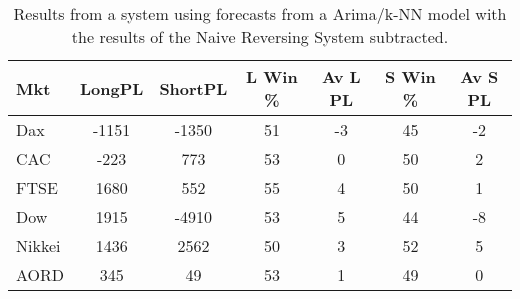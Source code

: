 \begin{table}[ht]
\centering
\caption[Mean PL from hybrid ARIMA/k-NN models minus mean PL from Naive Reverse system]{Results from a system using forecasts from a Arima/k-NN model with the results of the Naive Reversing System subtracted.} 
\label{tab:chp_ts:pred_close_arima_knn_sys1_diff}
\begin{tabular}{lcccccc}
  \toprule Mkt & LongPL & ShortPL & L Win \% & Av L PL & S Win \% & Av S PL \\ 
  \midrule Dax & -1151 & -1350 & 51 & -3 & 45 & -2 \\ 
  CAC & -223 & 773 & 53 & 0 & 50 & 2 \\ 
  FTSE & 1680 & 552 & 55 & 4 & 50 & 1 \\ 
  Dow & 1915 & -4910 & 53 & 5 & 44 & -8 \\ 
  Nikkei & 1436 & 2562 & 50 & 3 & 52 & 5 \\ 
  AORD & 345 & 49 & 53 & 1 & 49 & 0 \\ 
   \bottomrule \end{tabular}
\end{table}
